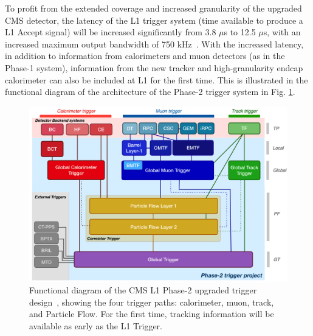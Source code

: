 To profit from the extended coverage and increased granularity of the upgraded CMS detector, the latency of the L1 trigger system (time available to produce a L1 Accept signal) will be increased significantly from 3.8 $\mu$s to 12.5 $\mu$s, with an increased maximum output bandwidth of 750 kHz~\cite{CMS-TDR-021}. With the increased latency, in addition to information from calorimeters and muon detectors (as in the Phase-1 system), information from the new tracker and high-granularity endcap calorimeter can also be included at L1 for the first time. This is illustrated in the functional diagram of the architecture of the Phase-2 trigger system in Fig. \ref{fig:phase-2-l1-architecture}. 

\begin{figure}[ht]
    \centering
    \includegraphics[width=15cm]{figures/ch-3-phase2/phase-2-l1-architecture.png}
    \caption[Functional diagram of the CMS L1 Phase-2 upgraded trigger design.]{Functional diagram of the CMS L1 Phase-2 upgraded trigger design~\cite{CMS-TDR-021}, showing the four trigger paths: calorimeter, muon, track, and Particle Flow. For the first time, tracking information will be available as early as the L1 Trigger.}
    \label{fig:phase-2-l1-architecture}
\end{figure}

